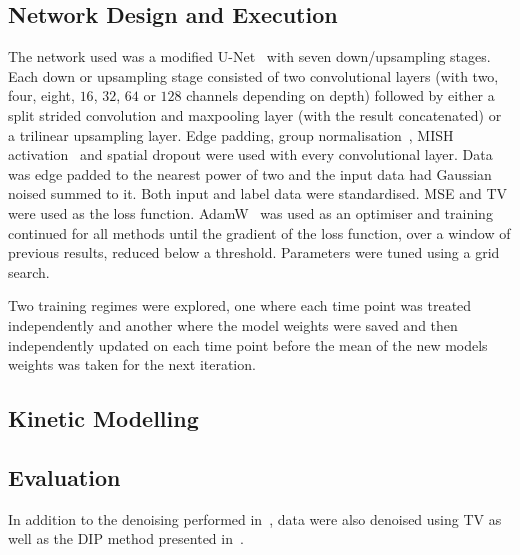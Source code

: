     
    \subsection{Network Design and Execution} \label{sec:network_design_and_execution}
        The network used was a modified U-Net~\cite{Weng2015U-Net:Segmentation} with seven down/upsampling stages. Each down or upsampling stage consisted of two convolutional layers (with two, four, eight, $16$, $32$, $64$ or $128$ channels depending on depth) followed by either a split strided convolution and maxpooling layer (with the result concatenated) or a trilinear upsampling layer. Edge padding, group normalisation~\cite{Wu2018GroupNormalization}, MISH activation~\cite{Misra2020Mish:Function} and spatial dropout were used with every convolutional layer. Data was edge padded to the nearest power of two and the input data had Gaussian noised summed to it. Both input and label data were standardised. \gls{MSE} and \gls{TV} were used as the loss function. AdamW~\cite{Loshchilov2017DecoupledRegularization} was used as an optimiser and training continued for all methods until the gradient of the loss function, over a window of previous results, reduced below a threshold. Parameters were tuned using a grid search.
        
        Two training regimes were explored, one where each time point was treated independently and another where the model weights were saved and then independently updated on each time point before the mean of the new models weights was taken for the next iteration.
        
    
    \subsection{Kinetic Modelling} \label{sec:kinetic_modelling}
        
        
    
    \subsection{Evaluation} \label{sec:evaluation}
        In addition to the denoising performed in~, data were also denoised using \gls{TV} as well as the \gls{DIP} method presented in~\cite{Gong2019PETPrior}.
        
